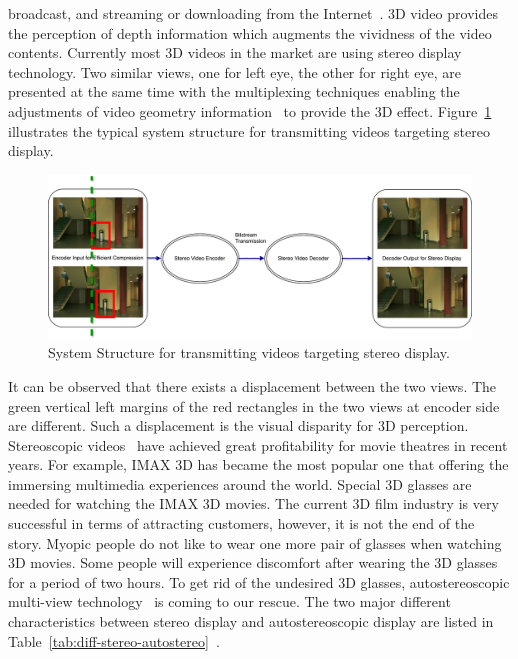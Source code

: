 broadcast, and streaming or downloading from the Internet~\parencite{RN118}.
3D video provides the perception of depth information which augments
the vividness of the video contents.
Currently most 3D videos in the market are using stereo display technology.
Two similar views, one for left eye, the other for right eye, are presented
at the same time with the multiplexing techniques enabling the
adjustments of video geometry information~\parencite{RN196} to provide
the 3D effect.
Figure~\ref{fig:stereo-display} illustrates the typical system structure for
transmitting videos targeting stereo display.
\begin{figure}
    \centering
    \includegraphics[width=\textwidth,height=\textheight,keepaspectratio]{Figures/StereoDisplay}
    \caption[System Structure for transmitting videos targeting stereo display]{System Structure for transmitting videos targeting stereo display.}
    \label{fig:stereo-display}
\end{figure}
It can be observed that there exists a displacement between the
two views.
The green vertical left margins of the red rectangles in the two views
at encoder side are different.
Such a displacement is the visual disparity for 3D perception.
Stereoscopic videos~\parencite{RN153} have
achieved great profitability for movie theatres in recent years.
For example, IMAX 3D has became the most popular one that offering
the immersing multimedia experiences around the world.
Special 3D glasses are needed for watching the IMAX 3D movies.
The current 3D film industry is very successful in terms of attracting
customers, however, it is not the end of the story.
Myopic people do not like to wear one more pair of glasses when
watching 3D movies.
Some people will experience discomfort after wearing the 3D glasses for a
period of two hours.
To get rid of the undesired 3D glasses,
autostereoscopic multi-view technology~\parencite{RN153} is coming to
our rescue.
The two major different characteristics between stereo display and
autostereoscopic display are
listed in Table~\ref{tab:diff-stereo-autostereo}~\parencite{RN44}.
